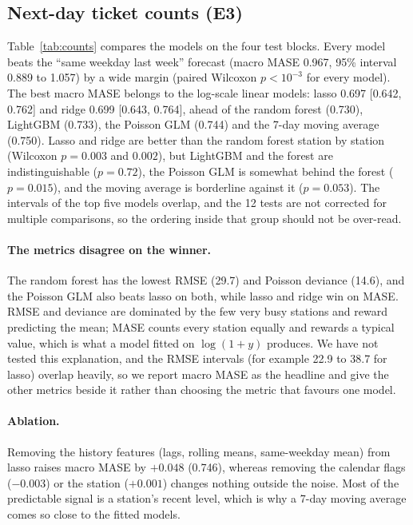 \subsection{Next-day ticket counts (E3)}
Table~\ref{tab:counts} compares the models on the four test blocks. Every model beats the ``same weekday last week'' forecast (macro MASE 0.967, 95\% interval 0.889 to 1.057) by a wide margin (paired Wilcoxon $p<10^{-3}$ for every model). The best macro MASE belongs to the log-scale linear models: lasso 0.697 [0.642, 0.762] and ridge 0.699 [0.643, 0.764], ahead of the random forest (0.730), LightGBM (0.733), the Poisson GLM (0.744) and the 7-day moving average (0.750). Lasso and ridge are better than the random forest station by station (Wilcoxon $p=0.003$ and $0.002$), but LightGBM and the forest are indistinguishable ($p=0.72$), the Poisson GLM is somewhat behind the forest ($p=0.015$), and the moving average is borderline against it ($p=0.053$). The intervals of the top five models overlap, and the 12 tests are not corrected for multiple comparisons, so the ordering inside that group should not be over-read.

\begin{table}[t]
\centering\small
\caption{T1, next-day ticket counts per station, four time-blocked folds. Macro MASE is per station and then averaged (1.0 is the same-weekday-last-week forecast; lower is better); the interval resamples stations. Pooled MASE uses the test-window denominator and is not comparable with the macro column or with the hackathon's 0.73.}
\label{tab:counts}

\end{table}

\paragraph{The metrics disagree on the winner.} The random forest has the lowest RMSE (29.7) and Poisson deviance (14.6), and the Poisson GLM also beats lasso on both, while lasso and ridge win on MASE. RMSE and deviance are dominated by the few very busy stations and reward predicting the mean; MASE counts every station equally and rewards a typical value, which is what a model fitted on $\log(1+y)$ produces. We have not tested this explanation, and the RMSE intervals (for example 22.9 to 38.7 for lasso) overlap heavily, so we report macro MASE as the headline and give the other metrics beside it rather than choosing the metric that favours one model.

\paragraph{Ablation.} Removing the history features (lags, rolling means, same-weekday mean) from lasso raises macro MASE by $+0.048$ (0.746), whereas removing the calendar flags ($-0.003$) or the station ($+0.001$) changes nothing outside the noise. Most of the predictable signal is a station's recent level, which is why a 7-day moving average comes so close to the fitted models.
